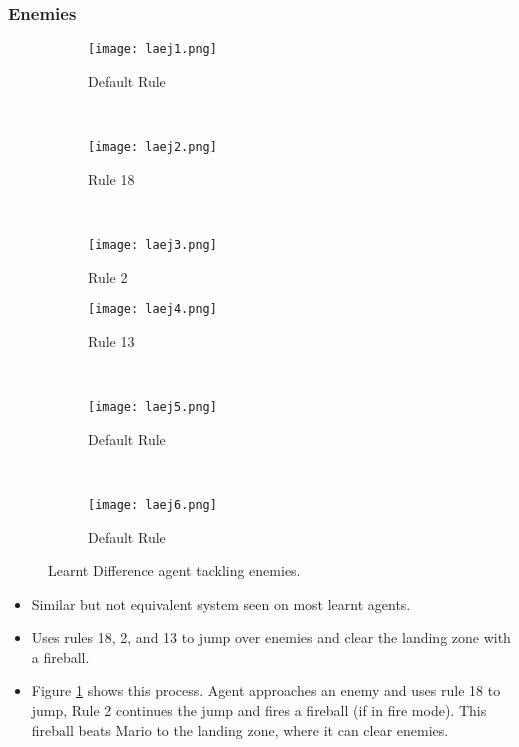 \clearpage
\subsubsection*{\hspace{6pt}Enemies}

\begin{figure}[t]
	\begin{adjustwidth}{-2cm}{-2cm}
    \centering
          \begin{subfigure}[b]{0.328\textwidth}
                  \centering
                  \texttt{[image: laej1.png]}
                  \caption{Default Rule}
          \end{subfigure}~
          \begin{subfigure}[b]{0.328\textwidth}
                  \centering
                  \texttt{[image: laej2.png]}
                  \caption{Rule 18}
          \end{subfigure}~
          \begin{subfigure}[b]{0.328\textwidth}
                  \centering
                  \texttt{[image: laej3.png]}
                  \caption{Rule 2}
          \end{subfigure}
          \begin{subfigure}[b]{0.328\textwidth}
                  \centering
                  \texttt{[image: laej4.png]}
                  \caption{Rule 13}
          \end{subfigure}~
          \begin{subfigure}[b]{0.328\textwidth}
                  \centering
                  \texttt{[image: laej5.png]}
                  \caption{Default Rule}
          \end{subfigure}~
          \begin{subfigure}[b]{0.328\textwidth}
                  \centering
                  \texttt{[image: laej6.png]}
                  \caption{Default Rule}
          \end{subfigure}
    \caption{Learnt Difference agent tackling enemies.}\label{fig:laej}
    \end{adjustwidth}
\end{figure}


\begin{itemize}
\item Similar but not equivalent system seen on most learnt agents.
\item Uses rules 18, 2, and 13 to jump over enemies and clear the landing zone with a fireball.
\item Figure \ref{fig:laej} shows this process. Agent approaches an enemy and uses rule 18 to jump, Rule 2 continues the jump and fires a fireball (if in fire mode). This fireball beats Mario to the landing zone, where it can clear enemies.
\end{itemize}


